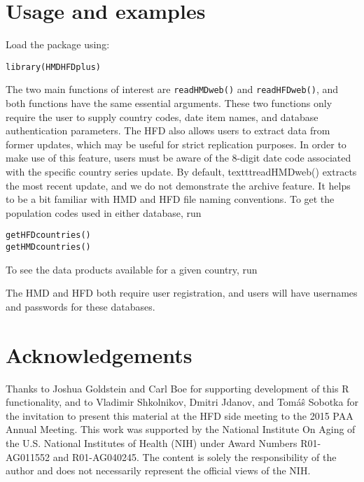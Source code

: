 \documentclass{article}
\begin{document}
\section{Usage and examples}
Load the package using:
\begin{verbatim}
library(HMDHFDplus)
\end{verbatim}
The two main functions of interest are \texttt{readHMDweb()} and
\texttt{readHFDweb()}, and both functions have the same essential
arguments. These two functions only require the user to supply country codes,
date item names, and database authentication parameters. The HFD also allows
users to extract data from former updates, which may be useful for
strict replication purposes. In order to make use of this feature, users must
be aware of the 8-digit date code associated with the specific country series
update. By default, texttt{readHMDweb()} extracts the most recent update,
and we do not demonstrate the archive feature. It helps to be a bit familiar
with HMD and HFD file naming conventions.
To get the population codes used in either database, run 
\begin{verbatim}
getHFDcountries()
getHMDcountries()
\end{verbatim}
To see the data products available for a given country, run

The HMD and HFD both require user registration, and users will have usernames
and passwords for these databases.

\section{Acknowledgements}
Thanks to Joshua Goldstein and Carl Boe for supporting development of this R
functionality, and to Vladimir Shkolnikov, Dmitri Jdanov, and Tom\'{a}\^{s}
Sobotka for the invitation to present this material at the HFD side meeting to
the 2015 PAA Annual Meeting.
This work was supported by the National Institute On Aging of the U.S. National Institutes of Health (NIH) under Award Numbers R01-AG011552 and R01-AG040245. The content is solely the responsibility of the
author and does not necessarily represent the official views of the NIH.


   
\end{document}
